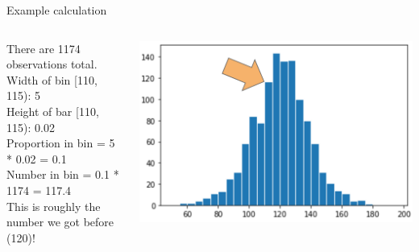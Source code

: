 \documentclass[aspectratio=169]{../latex_main/tntbeamer}  %
\begin{document}
     \begin{frame}[c]{Example calculation}
        \begin{columns}
            \begin{column}{.4\textwidth}
                   There are 1174 observations total.\\
                   \bigskip
                    Width of bin [110, 115): 5\\
                    Height of bar [110, 115): 0.02\\
                    Proportion in bin = 5 * 0.02 = 0.1\\
                    Number in bin = 0.1 * 1174 = 117.4\\
                    \bigskip
                    This is roughly the number we got before (120)!

            \end{column}
            
            
            \begin{column}{.4\textwidth}
            
                       \includegraphics[scale=.35]{Bild30}

            \end{column}
        \end{columns}
    \end{frame}
    
    
    
\end{document}
